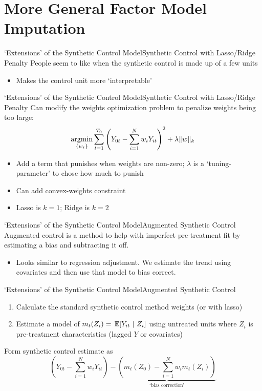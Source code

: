 \documentclass[aspectratio=169,t,11pt,table]{beamer}
\begin{document}
\section{More General Factor Model Imputation}

\begin{frame}{`Extensions' of the Synthetic Control Model}{Synthetic Control with Lasso/Ridge Penalty}
  People seem to like when the synthetic control is made up of a few units
  \begin{itemize}
    \item Makes the control unit more `interpretable'
  \end{itemize}
\end{frame}

\begin{frame}{`Extensions' of the Synthetic Control Model}{Synthetic Control with Lasso/Ridge Penalty}
  Can modify the weights optimization problem to penalize weights being too large:
  $$
    \operatorname*{argmin}_{ \{ w_i \} } \sum_{t=1}^{T_0} \left( Y_{0t} - \sum_{i=1}^N w_i Y_{it} \right)^2 + \lambda \| w \|_k
  $$
  \begin{itemize}
    \item Add a term that punishes when weights are non-zero; $\lambda$ is a `tuning-parameter' to chose how much to punish
    \item Can add convex-weights constraint
    \item Lasso is $k = 1$; Ridge is $k = 2$
  \end{itemize}
\end{frame}


\begin{frame}{`Extensions' of the Synthetic Control Model}{Augmented Synthetic Control}
  Augmented control is a method to help with imperfect pre-treatment fit by estimating a bias and subtracting it off. 
  \begin{itemize}
    \item Looks similar to regression adjustment. We estimate the trend using covariates and then use that model to bias correct. 
  \end{itemize}
\end{frame}

\begin{frame}{`Extensions' of the Synthetic Control Model}{Augmented Synthetic Control}
  \begin{enumerate}
    \item Calculate the standard synthetic control method weights (or with lasso)
    \item Estimate a model of $m_{t}(Z_i) = \expec{Y_{it}}{Z_i}$ using untreated units where $Z_i$ is pre-treatment characteristics (lagged $Y$ or covariates)
  \end{enumerate}

  \bigskip
  Form synthetic control estimate as 
  $$
    \left( Y_{0t} - \sum_{i = 1}^N w_i Y_{it} \right) -
      \underbrace{\left( m_{t}(Z_0) - \sum_{i = 1}^N w_i m_t(Z_i) \right)}_{\text{`bias correction'}}
  $$
\end{frame}
\end{document}
